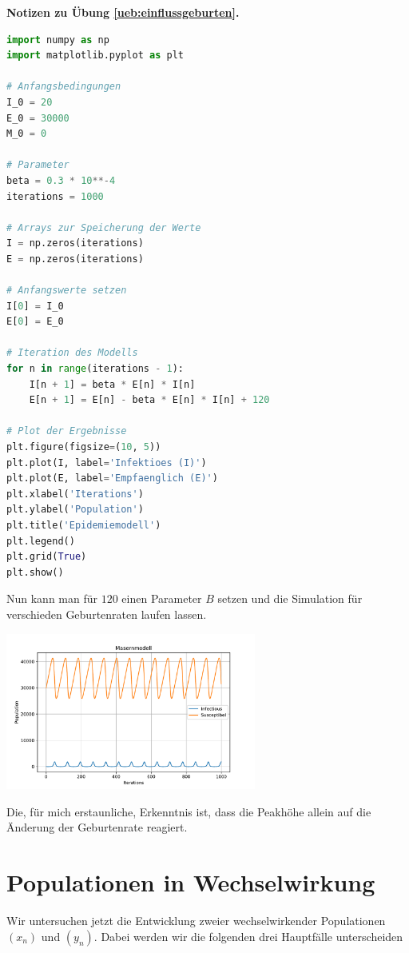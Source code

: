 \documentclass[%
11pt,%
twoside,%
titlepage,%
german,%
headsepline%
]{scrartcl}
\newcommand{\concatueb}[1]{ueb:#1}%
\newcommand{\concatlsg}[1]{lsg:#1}%
\newenvironment{lsg}[1]{%
    \par\noindent\textbf{Notizen zu Übung \ref{\concatueb{#1}}.}%
    \label{\concatlsg{#1}}
}{%
    \par%
}
\begin{document}
\begin{lsg}{einflussgeburten}
    \begin{lstlisting}[language=python]
import numpy as np
import matplotlib.pyplot as plt

# Anfangsbedingungen
I_0 = 20
E_0 = 30000
M_0 = 0

# Parameter
beta = 0.3 * 10**-4
iterations = 1000

# Arrays zur Speicherung der Werte
I = np.zeros(iterations)
E = np.zeros(iterations)

# Anfangswerte setzen
I[0] = I_0
E[0] = E_0

# Iteration des Modells
for n in range(iterations - 1):
    I[n + 1] = beta * E[n] * I[n]
    E[n + 1] = E[n] - beta * E[n] * I[n] + 120

# Plot der Ergebnisse
plt.figure(figsize=(10, 5))
plt.plot(I, label='Infektioes (I)')
plt.plot(E, label='Empfaenglich (E)')
plt.xlabel('Iterations')
plt.ylabel('Population')
plt.title('Epidemiemodell')
plt.legend()
plt.grid(True)
plt.show()
\end{lstlisting}

Nun kann man für $120$ einen Parameter $B$ setzen und die Simulation für verschieden Geburtenraten laufen lassen.
    
\begin{center}	
\includegraphics[width=0.618\textwidth]{pictures/masernmodellpdf}
\end{center}

    Die, für mich erstaunliche, Erkenntnis ist, dass die Peakhöhe allein auf die Änderung der Geburtenrate reagiert.
\end{lsg}

\clearpage

\section{Populationen in Wechselwirkung}
Wir
untersuchen jetzt die Entwicklung zweier wechselwirkender Populationen $(x_n)$ und $(y_n)$. Dabei werden wir die folgenden drei Hauptfälle unterscheiden
\end{document}
